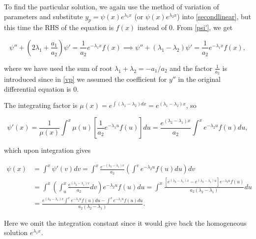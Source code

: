 \documentclass[english,a4paper,12pt]{report}
\begin{document}
To find the particular solution, we again use the method of variation of parameters and substitute \( y_{p} = \psi (x)e^{\lambda _{1}x }\) (or \(\psi (x)e^{\lambda _{2}x } \)) into \cref{secondlinear}, but this time the RHS of the equation is \(f(x)\) instead of 0. From \cref{psi'}, we get 

\begin{equation}
    \psi '' + \left(2\lambda _{1} + \frac{a_1 }{a_2 } \right)  \psi ' = \frac{1}{a_2 } e^{-\lambda _{1}x }f(x) \implies \psi '' + \left(\lambda _{1}  - \lambda _{2} \right) \psi ' = \frac{1}{a_2 } e^{-\lambda _{1} x } f(x), 
\end{equation}

where we have used the sum of root \( \lambda _{1} + \lambda _{2} = -a_1 /a_2  \) and the factor \(\frac{1}{a_2 }  \) is introduced since in \cref{vp} we assumed the coefficient for \(y''\) in the original differential equation is \(0\).   

The integrating factor is \( \mu  (x) = e^{\int (\lambda _{1} - \lambda _{2}  ) dx} = e^{(\lambda _{1} - \lambda _{2}  )x}  \), so

\begin{equation}
    \psi'(x) = \frac{1}{\mu (x)} \int^x \mu (u) \left[ \frac{1}{a_2} e^{-\lambda_1 u} f(u) \right] du = \frac{e^{(\lambda_2 - \lambda_1)x}}{a_2} \int^x e^{-\lambda_2 u} f(u) du,
\end{equation}

which upon integration gives

\begin{equation}
    \begin{aligned}
    \psi(x) &= \int^x \psi'(v) dv = \int^x \frac{e^{-(\lambda_2 - \lambda_1) v}}{a_2} \left(\int^v e^{-\lambda_2 u} f(u) du \right) dv \\
    & = \int^x \left( \int^x_u \frac{e^{(\lambda_2 - \lambda_1) v}}{a_2}  dv \right) e^{-\lambda_2 u} f(u)  du = \int^x \frac{\left[e^{(\lambda_2 - \lambda_1) x} - e^{(\lambda_2 - \lambda_1) u}\right] e^{-\lambda_2 u} f(u)}{a_2 (\lambda_2 - \lambda_1)}  du \\
    &= \frac{e^{(\lambda_2 - \lambda_1) x} \int^x e^{-\lambda_2 u} f(u)  du - \int^x e^{-\lambda_1 u} f(u)  du}{a_2 (\lambda_2 - \lambda_1)}.
    \end{aligned}
\end{equation}

Here we omit the integration constant since it would give back the homogeneous solution \(e^{\lambda _{1}x } \).
\end{document}
